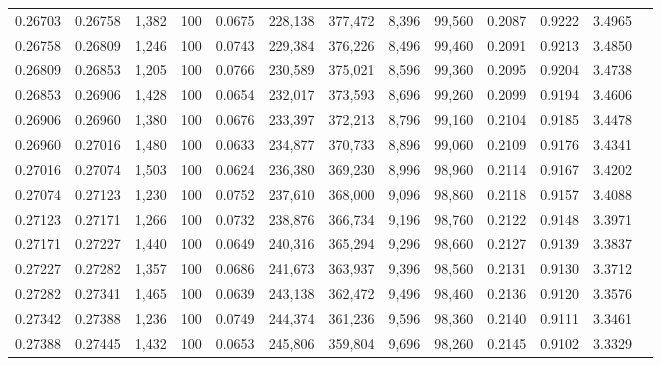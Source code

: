 \begin{tabular}{rrrrrrrrrrrrr}
0.26703 & 0.26758 &  1,382 & 100 &                                     0.0675 & 228,138 & 377,472 &   8,396 &  99,560 & 0.2087 & 0.9222 & 3.4965 \\
0.26758 & 0.26809 &  1,246 & 100 &                                     0.0743 & 229,384 & 376,226 &   8,496 &  99,460 & 0.2091 & 0.9213 & 3.4850 \\
0.26809 & 0.26853 &  1,205 & 100 &                                     0.0766 & 230,589 & 375,021 &   8,596 &  99,360 & 0.2095 & 0.9204 & 3.4738 \\
0.26853 & 0.26906 &  1,428 & 100 &                                     0.0654 & 232,017 & 373,593 &   8,696 &  99,260 & 0.2099 & 0.9194 & 3.4606 \\
0.26906 & 0.26960 &  1,380 & 100 &                                     0.0676 & 233,397 & 372,213 &   8,796 &  99,160 & 0.2104 & 0.9185 & 3.4478 \\
0.26960 & 0.27016 &  1,480 & 100 &                                     0.0633 & 234,877 & 370,733 &   8,896 &  99,060 & 0.2109 & 0.9176 & 3.4341 \\
0.27016 & 0.27074 &  1,503 & 100 &                                     0.0624 & 236,380 & 369,230 &   8,996 &  98,960 & 0.2114 & 0.9167 & 3.4202 \\
0.27074 & 0.27123 &  1,230 & 100 &                                     0.0752 & 237,610 & 368,000 &   9,096 &  98,860 & 0.2118 & 0.9157 & 3.4088 \\
0.27123 & 0.27171 &  1,266 & 100 &                                     0.0732 & 238,876 & 366,734 &   9,196 &  98,760 & 0.2122 & 0.9148 & 3.3971 \\
0.27171 & 0.27227 &  1,440 & 100 &                                     0.0649 & 240,316 & 365,294 &   9,296 &  98,660 & 0.2127 & 0.9139 & 3.3837 \\
0.27227 & 0.27282 &  1,357 & 100 &                                     0.0686 & 241,673 & 363,937 &   9,396 &  98,560 & 0.2131 & 0.9130 & 3.3712 \\
0.27282 & 0.27341 &  1,465 & 100 &                                     0.0639 & 243,138 & 362,472 &   9,496 &  98,460 & 0.2136 & 0.9120 & 3.3576 \\
0.27342 & 0.27388 &  1,236 & 100 &                                     0.0749 & 244,374 & 361,236 &   9,596 &  98,360 & 0.2140 & 0.9111 & 3.3461 \\
0.27388 & 0.27445 &  1,432 & 100 &                                     0.0653 & 245,806 & 359,804 &   9,696 &  98,260 & 0.2145 & 0.9102 & 3.3329 \\

\end{tabular}
